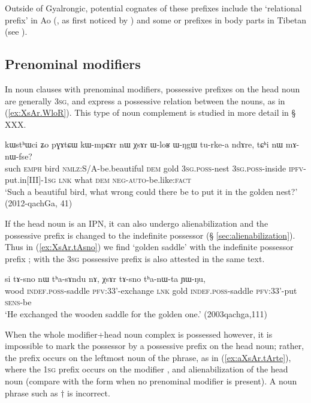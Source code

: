 Outside of Gyalrongic, potential cognates of these prefixes include the `relational prefix'  in Ao (\citealt[84-85]{coupe07mongsen}, as first noticed by \citealt[141-2]{wolfenden29outlines}) and some  or  prefixes in body parts in Tibetan (see \citealt{jacques14snom}).

\subsection{Prenominal modifiers} \label{sec:possessive.prefixes.prenominal}
In noun clauses with prenominal modifiers, possessive prefixes on the head noun are generally \textsc{3sg}, and express a possessive relation between the nouns, as in (\ref{ex:XsAr.WloR}). This type of noun complement is studied in more detail in § XXX.

\begin{exe}
\ex \label{ex:XsAr.WloR}
\gll kɯstʰɯci ʑo pɣɤtɕɯ kɯ-mpɕɤr nɯ χsɤr ɯ-loʁ ɯ-ŋgɯ tu-rke-a ndɤre, tɕʰi nɯ mɤ-nɯ-fse? \\
such \textsc{emph} bird \textsc{nmlz}:S/A-be.beautiful \textsc{dem} gold \textsc{3sg}.\textsc{poss}-nest \textsc{3sg}.\textsc{poss}-inside \textsc{ipfv}-put.in[III]-\textsc{1sg} \textsc{lnk} what \textsc{dem} \textsc{neg}-\textsc{auto}-be.like:\textsc{fact} \\
\glt `Such a beautiful bird, what wrong could there be to put it in the golden nest?' (2012-qachGa, 41)
\end{exe}

If the head noun is an IPN, it can also undergo alienabilization and the possessive prefix is changed to the indefinite possessor (§ \ref{sec:alienabilization}). Thus in (\ref{ex:XsAr.tAsno}) we find  `golden saddle' with the indefinite possessor prefix ;  with the \textsc{3sg} possessive prefix is also attested in the same text.

\begin{exe}
\ex \label{ex:XsAr.tAsno}
\gll si tɤ-sno nɯ tʰa-sɤndu nɤ, χsɤr tɤ-sno tʰa-nɯ-ta ɲɯ-ŋu, \\
wood \textsc{indef}.\textsc{poss}-saddle \textsc{pfv}:3\fl{}3'-exchange \textsc{lnk} gold  \textsc{indef}.\textsc{poss}-saddle \textsc{pfv}:3\fl{}3'-put \textsc{sens}-be \\
\glt `He exchanged the wooden saddle for the golden one.' (2003qachga,111)
\end{exe}

When the whole modifier+head noun complex is possessed however, it is impossible to mark the possessor by a possessive prefix on the head noun; rather, the prefix occurs on the leftmost noun of the phrase, as in (\ref{ex:aXsAr.tArte}), where the \textsc{1sg} prefix  occurs on the modifier , and alienabilization of the head noun  (compare with the form  when no prenominal modifier is present). A noun phrase such as $\dagger$ is incorrect.

